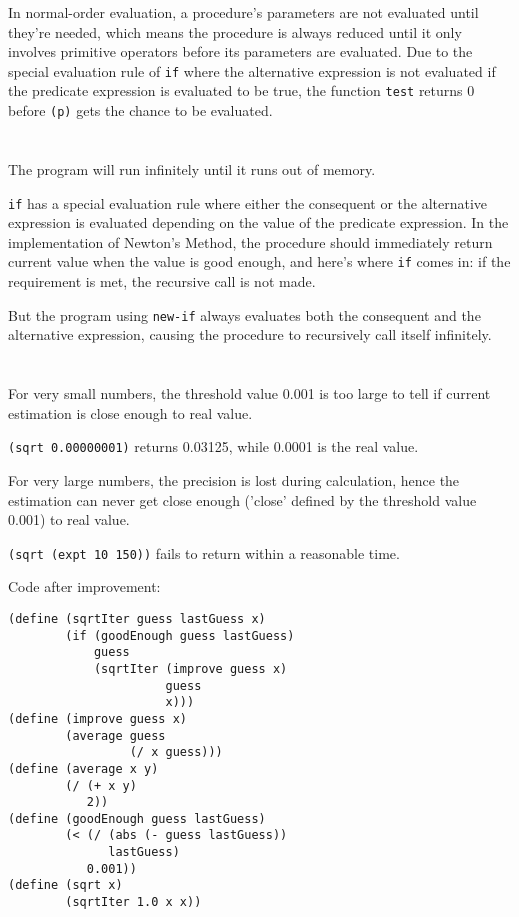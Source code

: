 \documentclass[a4paper]{report}
\begin{document}
In normal-order evaluation, a procedure's parameters are not evaluated until they're needed, which means the procedure is always reduced until it only involves primitive operators before its parameters are evaluated. Due to the special evaluation rule of \lstinline{if} where the alternative expression is not evaluated if the predicate expression is evaluated to be true, the function \lstinline{test} returns 0 before \lstinline{(p)} gets the chance to be evaluated.


\section{}

The program will run infinitely until it runs out of memory.

\lstinline{if} has a special evaluation rule where either the consequent or the alternative expression is evaluated depending on the value of the predicate expression. In the implementation of Newton's Method, the procedure should immediately return current value when the value is good enough, and here's where \lstinline{if} comes in: if the requirement is met, the recursive call is not made.
 
But the program using \lstinline{new-if} always evaluates both the consequent and the alternative expression, causing the procedure to recursively call itself infinitely.


\section{}

For very small numbers, the threshold value 0.001 is too large to tell if current estimation is close enough to real value.

\lstinline{(sqrt 0.00000001)} returns 0.03125, while 0.0001 is the real value.

For very large numbers, the precision is lost during calculation, hence the estimation can never get close enough ('close' defined by the threshold value 0.001) to real value.

\lstinline{(sqrt (expt 10 150))} fails to return within a reasonable time.

Code after improvement:

\begin{lstlisting}
(define (sqrtIter guess lastGuess x)
        (if (goodEnough guess lastGuess)
            guess
            (sqrtIter (improve guess x)
                      guess
                      x)))
(define (improve guess x)
        (average guess
                 (/ x guess)))
(define (average x y)
        (/ (+ x y)
           2))
(define (goodEnough guess lastGuess)
        (< (/ (abs (- guess lastGuess))
              lastGuess)
           0.001))
(define (sqrt x)
        (sqrtIter 1.0 x x))
\end{lstlisting}
\end{document}
